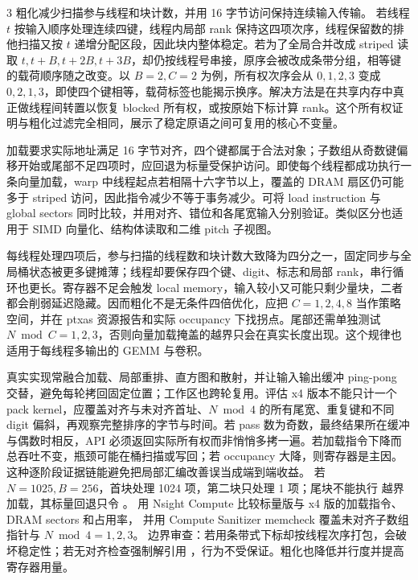 \begin{solutionexercise}{3}
\conclusionheading 粗化减少扫描参与线程和块计数，并用 16 字节访问保持连续输入传输。
\discussionheading
{}若线程 $t$ 按输入顺序处理连续四键，线程内局部 rank 保持这四项次序，线程保留数的排他扫描又按 $t$ 递增分配区段，因此块内整体稳定。若为了全局合并改成 striped 读取 $t,t+B,t+2B,t+3B$，却仍按线程号串接，原序会被改成条带分组，相等键的载荷顺序随之改变。以 $B=2,C=2$ 为例，所有权次序会从 $0,1,2,3$ 变成 $0,2,1,3$，即使四个键相等，载荷标签也能揭示换序。解决方法是在共享内存中真正做线程间转置以恢复 blocked 所有权，或按原始下标计算 rank。这个所有权证明与粗化过滤完全相同，展示了稳定原语之间可复用的核心不变量。

 加载要求实际地址满足 16 字节对齐，四个键都属于合法对象；子数组从奇数键偏移开始或尾部不足四项时，应回退为标量受保护访问。即使每个线程都成功执行一条向量加载，warp 中线程起点若相隔十六字节以上，覆盖的 DRAM 扇区仍可能多于 striped 访问，因此指令减少不等于事务减少。可将 load instruction 与 global sectors 同时比较，并用对齐、错位和各尾宽输入分别验证。类似区分也适用于 SIMD 向量化、结构体读取和二维 pitch 子视图。

每线程处理四项后，参与扫描的线程数和块计数大致降为四分之一，固定同步与全局桶状态被更多键摊薄；线程却要保存四个键、digit、标志和局部 rank，串行循环也更长。寄存器不足会触发 local memory，输入较小又可能只剩少量块，二者都会削弱延迟隐藏。因而粗化不是无条件四倍优化，应把 $C=1,2,4,8$ 当作策略空间，并在 ptxas 资源报告和实际 occupancy 下找拐点。尾部还需单独测试 $N\bmod C=1,2,3$，否则向量加载掩盖的越界只会在真实长度出现。这个规律也适用于每线程多输出的 GEMM 与卷积。

真实实现常融合加载、局部重排、直方图和散射，并让输入输出缓冲 ping-pong 交替，避免每轮拷回固定位置；工作区也跨轮复用。评估 x4 版本不能只计一个 pack kernel，应覆盖对齐与未对齐首址、$N\bmod4$ 的所有尾宽、重复键和不同 digit 偏斜，再观察完整排序的字节与时间。若 pass 数为奇数，最终结果所在缓冲与偶数时相反，API 必须返回实际所有权而非悄悄多拷一遍。若加载指令下降而总吞吐不变，瓶颈可能在桶扫描或写回；若 occupancy 大降，则寄存器是主因。这种逐阶段证据链能避免把局部汇编改善误当成端到端收益。
\variantheading 若 $N=1025,B=256$，首块处理 1024 项，第二块只处理 1 项；尾块不能执行
越界  加载，其标量回退只令 。
\practiceheading 用 Nsight Compute 比较标量版与 x4 版的加载指令、DRAM sectors 和占用率，
并用 Compute Sanitizer memcheck 覆盖未对齐子数组指针与 $N\bmod4=1,2,3$。
边界审查：若用条带式下标却按线程次序打包，会破坏稳定性；若无对齐检查强制解引用
，行为不受保证。粗化也降低并行度并提高寄存器用量。
\end{solutionexercise}

